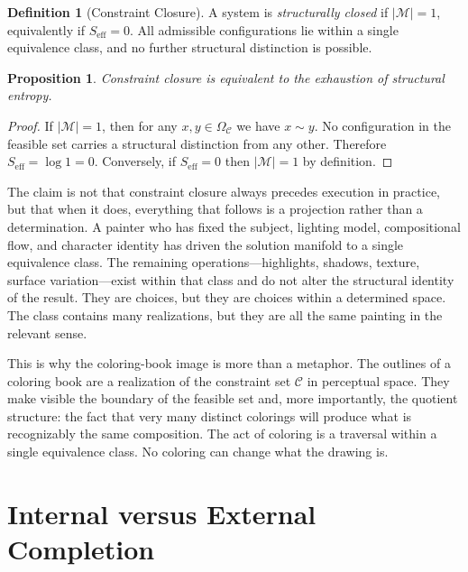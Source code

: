 \documentclass[11pt, twoside]{article}
\theoremstyle{plain}
\newtheorem{proposition}[theorem]{Proposition}
\theoremstyle{definition}
\newtheorem{definition}[theorem]{Definition}
\theoremstyle{remark}
\newcommand{\OmC}{\Omega_{\mathcal{C}}}
\newcommand{\Seff}{S_{\text{eff}}}
\begin{document}
\begin{definition}[Constraint Closure]
\label{def:closure}
A system is \emph{structurally closed} if $|\mathcal{M}| = 1$, equivalently if $\Seff = 0$. All admissible configurations lie within a single equivalence class, and no further structural distinction is possible.
\end{definition}

\begin{proposition}
\label{prop:closure-entropy}
Constraint closure is equivalent to the exhaustion of structural entropy.
\end{proposition}

\begin{proof}
If $|\mathcal{M}| = 1$, then for any $x, y \in \OmC$ we have $x \sim y$. No configuration in the feasible set carries a structural distinction from any other. Therefore $\Seff = \log 1 = 0$. Conversely, if $\Seff = 0$ then $|\mathcal{M}| = 1$ by definition.
\end{proof}

The claim is not that constraint closure always precedes execution in practice, but that when it does, everything that follows is a projection rather than a determination. A painter who has fixed the subject, lighting model, compositional flow, and character identity has driven the solution manifold to a single equivalence class. The remaining operations---highlights, shadows, texture, surface variation---exist within that class and do not alter the structural identity of the result. They are choices, but they are choices within a determined space. The class contains many realizations, but they are all the same painting in the relevant sense.

This is why the coloring-book image is more than a metaphor. The outlines of a coloring book are a realization of the constraint set $\mathcal{C}$ in perceptual space. They make visible the boundary of the feasible set and, more importantly, the quotient structure: the fact that very many distinct colorings will produce what is recognizably the same composition. The act of coloring is a traversal within a single equivalence class. No coloring can change what the drawing is.

\section{Internal versus External Completion}
\label{sec:internal-external}
\end{document}
